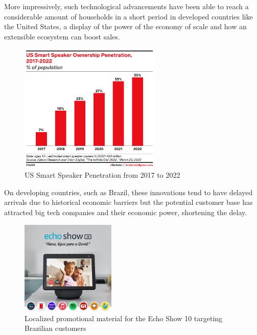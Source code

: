 \documentclass[openright]{normas-utf-tex} %
\begin{document}
More impressively, such technological advancements have been able to reach a considerable amount of households in
a short period in developed countries like the United States, a display of the power of the economy of scale and how
an extensible ecosystem can boost sales.

\begin{figure}[H]
	\centering
	\includegraphics[width=0.6\textwidth]{./images/smartspeaker.png} %
	\caption[US Smart Speaker Penetration from 2017 to 2022]{US Smart Speaker Penetration from 2017 to 2022}
	\label{fig:smartspeaker}
\end{figure}

On developing countries, such as Brazil, these innovations tend to have delayed
arrivals due to historical economic barriers but the potential customer base
has attracted big tech companies and their economic power, shortening the
delay.

\begin{figure}[h!]
	\centering
	\includegraphics[width=0.4\textwidth]{./images/alexabr.jpg} %
	\caption[Localized promotional material for the Echo Show 10 targeting Brazilian customers]{Localized promotional material for the Echo Show 10 targeting Brazilian customers}
    \label{fig:alexabr}
\end{figure}
\end{document}

